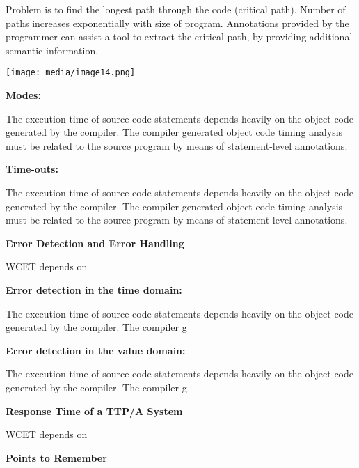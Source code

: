 Problem is to find the longest path through the code (critical path).
Number of paths increases exponentially with size of program.
Annotations provided by the programmer can assist a tool to extract the
critical path, by providing additional semantic information.

\texttt{[image: media/image14.png]}

\textbf{Modes:}

The execution time of source code statements depends heavily on the
object code generated by the compiler. The compiler generated object
code timing analysis must be related to the source program by means of
statement-level annotations.

\textbf{Time-outs:}

The execution time of source code statements depends heavily on the
object code generated by the compiler. The compiler generated object
code timing analysis must be related to the source program by means of
statement-level annotations.

\textbf{Error Detection and Error Handling}

WCET depends on

\textbf{Error detection in the time domain:}

The execution time of source code statements depends heavily on the
object code generated by the compiler. The compiler g

\textbf{Error detection in the value domain:}

The execution time of source code statements depends heavily on the
object code generated by the compiler. The compiler g

\textbf{Response Time of a TTP/A System}

WCET depends on

\protect\hypertarget{teil9}{}{}\textbf{Points to Remember}
